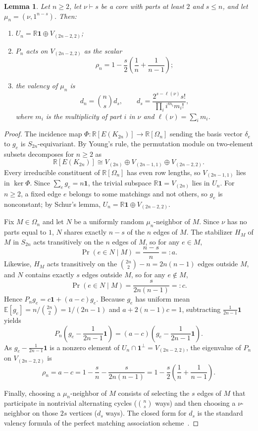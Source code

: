 \documentclass[11pt]{article}
\newtheorem{lemma}[theorem]{Lemma}
\theoremstyle{remark}
\newcommand{\R}{\mathbb{R}}
\newcommand{\E}{\mathbb{E}}
\newcommand{\one}{\mathbf{1}}
\begin{document}
\begin{lemma}\label{lem:target}
Let $n \ge 2$, let $\nu \vdash s$ be a core with parts at least $2$ and
$s \le n$, and let $\mu_n = (\nu, 1^{n-s})$. Then:
\begin{enumerate}
  \item $U_n = \R\one \oplus V_{(2n-2,2)}$;
  \item $P_n$ acts on $V_{(2n-2,2)}$ as the scalar
  \[
    \rho_n = 1 - \frac{s}{2}\left(\frac{1}{n} + \frac{1}{n-1}\right);
  \]
  \item the valency of $\mu_n$ is
  \[
    d_n = \binom{n}{s} d_s,
    \qquad
    d_s = \frac{2^{s - \ell(\nu)} s!}{\prod_i i^{m_i} m_i!},
  \]
  where $m_i$ is the multiplicity of part $i$ in $\nu$ and
  $\ell(\nu) = \sum_i m_i$.
\end{enumerate}
\end{lemma}

\begin{proof}
The incidence map $\Phi \colon \R[E(K_{2n})] \to \R[\Omega_n]$ sending the
basis vector $\delta_e$ to $g_e$ is $S_{2n}$-equivariant. By Young's rule, the
permutation module on two-element subsets decomposes for $n \ge 2$ as
\[
  \R[E(K_{2n})] \cong V_{(2n)} \oplus V_{(2n-1,1)} \oplus V_{(2n-2,2)}.
\]
Every irreducible constituent of $\R[\Omega_n]$ has even row lengths, so
$V_{(2n-1,1)}$ lies in $\ker \Phi$. Since $\sum_e g_e = n\one$, the trivial
subspace $\R\one = V_{(2n)}$ lies in $U_n$. For $n \ge 2$, a fixed edge $e$
belongs to some matchings and not others, so $g_e$ is nonconstant; by Schur's
lemma, $U_n = \R\one \oplus V_{(2n-2,2)}$.

Fix $M \in \Omega_n$ and let $N$ be a uniformly random $\mu_n$-neighbor of $M$.
Since $\nu$ has no parts equal to $1$, $N$ shares exactly $n - s$ of the $n$
edges of $M$. The stabilizer $H_M$ of $M$ in $S_{2n}$ acts transitively on the
$n$ edges of $M$, so for any $e \in M$,
\[
  \Pr(e \in N \mid M) = \frac{n-s}{n} =: a.
\]
Likewise, $H_M$ acts transitively on the $\binom{2n}{2} - n = 2n(n-1)$ edges
outside $M$, and $N$ contains exactly $s$ edges outside $M$, so for any
$e \notin M$,
\[
  \Pr(e \in N \mid M) = \frac{s}{2n(n-1)} =: c.
\]
Hence $P_n g_e = c\one + (a - c) g_e$. Because $g_e$ has uniform mean
$\E[g_e] = n / \binom{2n}{2} = 1/(2n-1)$ and $a + 2(n-1)c = 1$, subtracting
$\frac{1}{2n-1}\one$ yields
\[
  P_n\!\left(g_e - \frac{1}{2n-1}\one\right)
  = (a - c)\!\left(g_e - \frac{1}{2n-1}\one\right).
\]
As $g_e - \frac{1}{2n-1}\one$ is a nonzero element of
$U_n \cap \one^\perp = V_{(2n-2,2)}$, the eigenvalue of $P_n$ on $V_{(2n-2,2)}$
is
\[
  \rho_n = a - c
  = 1 - \frac{s}{n} - \frac{s}{2n(n-1)}
  = 1 - \frac{s}{2}\left(\frac{1}{n} + \frac{1}{n-1}\right).
\]

Finally, choosing a $\mu_n$-neighbor of $M$ consists of selecting the $s$ edges
of $M$ that participate in nontrivial alternating cycles ($\binom{n}{s}$ ways)
and then choosing a $\nu$-neighbor on those $2s$ vertices ($d_s$ ways). The
closed form for $d_s$ is the standard valency formula of the perfect matching
association scheme~\cite[Lemmas~2.1--2.2]{GuptaEtAl}.
\end{proof}
\end{document}
